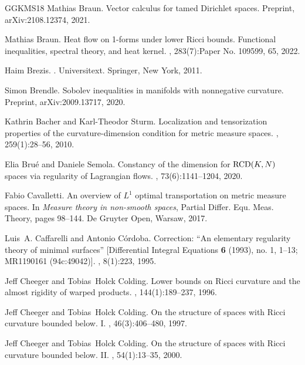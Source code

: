 \documentclass[11pt]{article}
\numberwithin{equation}{section}
\begin{document}
{\begin{thebibliography}{GGKMS18}
Mathias Braun.
\newblock Vector calculus for tamed {D}irichlet spaces.
\newblock Preprint, arXiv:2108.12374, 2021.

Mathias Braun.
\newblock Heat flow on 1-forms under lower {R}icci bounds. {F}unctional
  inequalities, spectral theory, and heat kernel.
, 283(7):Paper No. 109599, 65, 2022.

Haim Brezis.
.
\newblock Universitext. Springer, New York, 2011.

Simon Brendle.
\newblock Sobolev inequalities in manifolds with nonnegative curvature.
\newblock Preprint, arXiv:2009.13717, 2020.

Kathrin Bacher and Karl-Theodor Sturm.
\newblock Localization and tensorization properties of the curvature-dimension
  condition for metric measure spaces.
, 259(1):28--56, 2010.

Elia Bru\'{e} and Daniele Semola.
\newblock Constancy of the dimension for {${\rm RCD}(K,N)$} spaces via
  regularity of {L}agrangian flows.
, 73(6):1141--1204, 2020.

Fabio Cavalletti.
\newblock An overview of {$L^1$} optimal transportation on metric measure
  spaces.
\newblock In {\em Measure theory in non-smooth spaces}, Partial Differ. Equ.
  Meas. Theory, pages 98--144. De Gruyter Open, Warsaw, 2017.

Luis~A. Caffarelli and Antonio C\'{o}rdoba.
\newblock Correction: ``{A}n elementary regularity theory of minimal surfaces''
  [{D}ifferential {I}ntegral {E}quations {\bf 6} (1993), no. 1, 1--13;
  {MR}1190161 (94c:49042)].
, 8(1):223, 1995.

Jeff Cheeger and Tobias~Holck Colding.
\newblock Lower bounds on {R}icci curvature and the almost rigidity of warped
  products.
, 144(1):189--237, 1996.

Jeff Cheeger and Tobias~Holck Colding.
\newblock On the structure of spaces with {R}icci curvature bounded below. {I}.
, 46(3):406--480, 1997.

Jeff Cheeger and Tobias~Holck Colding.
\newblock On the structure of spaces with {R}icci curvature bounded below.
  {II}.
, 54(1):13--35, 2000.


\end{thebibliography}}
\end{document}
